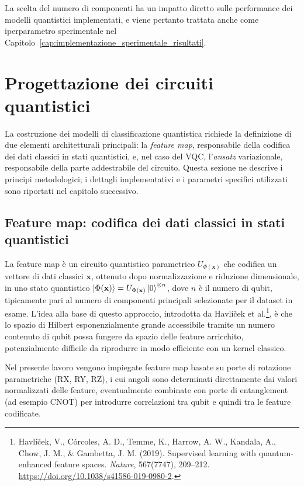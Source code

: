 La scelta del numero di componenti ha un impatto diretto sulle performance dei modelli quantistici implementati, e viene pertanto trattata anche come iperparametro sperimentale nel Capitolo~\ref{cap:implementazione_sperimentale_risultati}.

\section{Progettazione dei circuiti quantistici}
\label{sec:circuiti_quantistici}

La costruzione dei modelli di classificazione quantistica richiede la definizione di due elementi architetturali principali: la \textit{feature map}, responsabile della codifica dei dati classici in stati quantistici, e, nel caso del VQC, l'\textit{ansatz} variazionale, responsabile della parte addestrabile del circuito. Questa sezione ne descrive i principi metodologici; i dettagli implementativi e i parametri specifici utilizzati sono riportati nel capitolo successivo.

\subsection{Feature map: codifica dei dati classici in stati quantistici}
La feature map è un circuito quantistico parametrico $U_{\Phi(\mathbf{x})}$ che codifica un vettore di dati classici $\mathbf{x}$, ottenuto dopo normalizzazione e riduzione dimensionale, in uno stato quantistico $\ket{\Phi(\mathbf{x})} = U_{\Phi(\mathbf{x})}\ket{0}^{\otimes n}$, dove $n$ è il numero di qubit, tipicamente pari al numero di componenti principali selezionate per il dataset in esame. L'idea alla base di questo approccio, introdotta da Havlíček et al.\footnote{Havlíček, V., Córcoles, A. D., Temme, K., Harrow, A. W., Kandala, A., Chow, J. M., \& Gambetta, J. M. (2019). Supervised learning with quantum-enhanced feature spaces. \textit{Nature}, 567(7747), 209--212. \url{https://doi.org/10.1038/s41586-019-0980-2}.}, è che lo spazio di Hilbert esponenzialmente grande accessibile tramite un numero contenuto di qubit possa fungere da spazio delle feature arricchito, potenzialmente difficile da riprodurre in modo efficiente con un kernel classico.

Nel presente lavoro vengono impiegate feature map basate su porte di rotazione parametriche (RX, RY, RZ), i cui angoli sono determinati direttamente dai valori normalizzati delle feature, eventualmente combinate con porte di entanglement (ad esempio CNOT) per introdurre correlazioni tra qubit e quindi tra le feature codificate.

